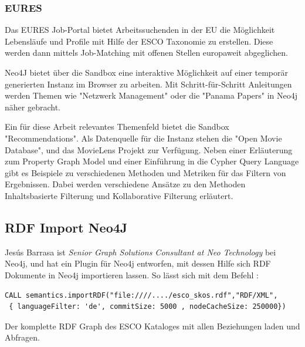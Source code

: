 \subsubsection{EURES}

Das EURES Job-Portal bietet Arbeitssuchenden in der EU die Möglichkeit Lebensläufe und Profile mit Hilfe der ESCO Taxonomie zu erstellen. Diese werden dann mittels Job-Matching mit offenen Stellen europaweit abgeglichen.\newline
{}

Neo4J bietet über die Sandbox eine interaktive Möglichkeit auf einer temporär generierten Instanz im Browser zu arbeiten. Mit Schritt-für-Schritt Anleitungen werden Themen wie "Netzwerk Management" oder die "Panama Papers" in Neo4j näher gebracht.\newline

Ein für diese Arbeit relevantes Themenfeld bietet die Sandbox "Recommendations".\cite{neo4j} Als Datenquelle für die Instanz stehen die "Open Movie Database"\cite{omdb}, und das MovieLens Projekt\cite{grouplens_2016} zur Verfügung.
Neben einer Erläuterung zum Property Graph Model und einer Einführung in die Cypher Query Language gibt es Beispiele zu verschiedenen Methoden und Metriken für das Filtern von Ergebnissen. Dabei werden verschiedene Ansätze zu den Methoden Inhaltsbasierte Filterung und Kollaborative Filterung erläutert. 
\subsection{RDF Import Neo4J}

Jesús Barrasa ist  \textit{Senior Graph Solutions Consultant at Neo Technology} bei Neo4j, und hat ein Plugin für Neo4j entworfen, mit dessen Hilfe sich RDF Dokumente in Neo4j importieren lassen. So lässt sich mit dem Befehl :
\vspace{1em}

\begin{lstlisting}[frame=htrbl, caption={Das Listing zeigt einen Funktionsaufruf über die Neo4j}, label={lst:result2}]
CALL semantics.importRDF("file:////..../esco_skos.rdf","RDF/XML",
 { languageFilter: 'de', commitSize: 5000 , nodeCacheSize: 250000})	
\end{lstlisting}

Der komplette RDF Graph des ESCO Kataloges mit allen Beziehungen laden und Abfragen.


